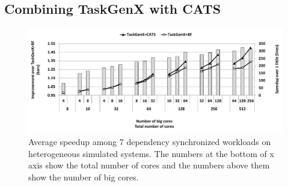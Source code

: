 \subsection{Combining TaskGenX with CATS}
\begin{figure}[t]%
	\centering
	\includegraphics[width=\columnwidth]{figures/TaskGenX+CATS.pdf}
	\caption{Average speedup among 7 dependency synchronized workloads on heterogeneous simulated systems. The numbers at the bottom of x axis show the total number of cores and the numbers above them show the number of big cores.}	
	\label{fig:hetero}
\end{figure}



